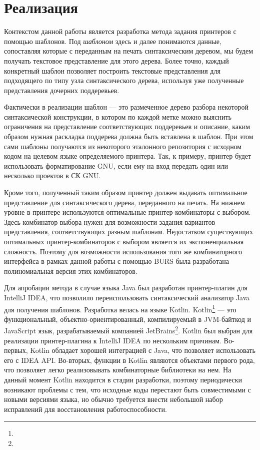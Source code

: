\section{Реализация}

Контекстом данной работы является разработка метода задания принтеров с помощью шаблонов.
Под \emph{шаблоном} здесь и далее понимаются данные, сопоставляя которые с
переданным на печать синтаксическим деревом, мы будем получать текстовое представление
для этого дерева. Более точно, каждый конкретный шаблон позволяет построить
текстовые представления для подходящего по типу 
узла синтаксического дерева, используя уже полученные представления дочерних поддеревьев.

Фактически в реализации шаблон --- это размеченное дерево разбора
некоторой синтаксической конструкции, в котором по каждой метке можно выяснить
ограничения на представление соответствующих поддеревьев и описание, каким
образом нужная раскладка поддерева должна быть вставлена в шаблон.
При этом сами шаблоны получаются из некоторого эталонного репозитория с исходном
кодом на целевом языке определяемого принтера.
Так, к примеру, принтер будет использовать форматирование GNU, если ему на вход
передать один или несколько проектов в СК GNU.

Кроме того, полученный таким образом принтер должен выдавать оптимальное представление
для синтаксического дерева, переданного на печать. На нижнем уровне в принтере 
используются оптимальные принтер-комбинаторы с выбором. Здесь комбинатор выбора нужен
для возможности задания вариантов представления, соответствующих разным шаблонам.
Недостатком существующих оптимальных принтер-комбинаторов с выбором \cite{swierstra}
является их экспоненциальная сложность. Поэтому для возможности использования того же
комбинаторного интерфейса в рамках данной работы с помощью BURS была разработана
полиномиальная версия этих комбинаторов.

Для апробации метода в случае языка Java был разработан принтер-плагин для
IntelliJ IDEA, что позволило переиспользовать синтаксический анализатор Java
для получения шаблонов.
Разработка велась на языке Kotlin.
Kotlin\footnote{}
--- это функциональный, объектно-ориентированный, компилируемый
в JVM-байткод и JavaScript язык, разрабатываемый компанией
JetBrains\footnote{}.
Kotlin был выбран для реализации принтер-плагина к IntelliJ IDEA по нескольким
причинам. 
Во-первых, Kotlin обладает хорошей интеграцией с Java, что позволяет
использовать его с IDEA API. 
Во-вторых, функции в Kotlin являются объектами первого рода, что позволяет
легко реализовывать комбинаторные библиотеки на нем.
На данный момент Kotlin находится в стадии разработки, поэтому
периодически возникают
проблемы с тем, что исходные коды перестают быть совместимыми с новыми
версиями языка,
но обычно требуется внести небольшой набор исправлений для
восстановления работоспособности.


